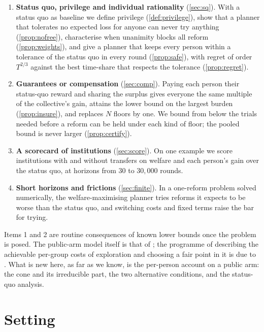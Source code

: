 \documentclass[11pt,a4paper]{article}
\theoremstyle{plain}
\theoremstyle{definition}
\theoremstyle{remark}
\begin{document}
\begin{enumerate}[leftmargin=*,itemsep=2pt]
  \item \textbf{Status quo, privilege and individual rationality} (\cref{sec:sq}). With a status quo as baseline we define privilege (\cref{def:privilege}), show that a planner that tolerates no expected loss for anyone can never try anything (\cref{prop:nofree}), characterise when unanimity blocks all reform (\cref{prop:weights}), and give a planner that keeps every person within a tolerance of the status quo in every round (\cref{prop:safe}), with regret of order $T^{2/3}$ against the best time-share that respects the tolerance (\cref{prop:regret}).
  \item \textbf{Guarantees or compensation} (\cref{sec:comp}). Paying each person their status-quo reward and sharing the surplus gives everyone the same multiple of the collective's gain, attains the lower bound on the largest burden (\cref{prop:insure}), and replaces $N$ floors by one. We bound from below the trials needed before a reform can be held under each kind of floor; the pooled bound is never larger (\cref{prop:certify}).
  \item \textbf{A scorecard of institutions} (\cref{sec:score}). On one example we score institutions with and without transfers on welfare and each person's gain over the status quo, at horizons from $30$ to $30{,}000$ rounds.
  \item \textbf{Short horizons and frictions} (\cref{sec:finite}). In a one-reform problem solved numerically, the welfare-maximising planner tries reforms it expects to be worse than the status quo, and switching costs and fixed terms raise the bar for trying.
\end{enumerate}

Items 1 and 2 are routine consequences of known lower bounds once the problem is posed. The public-arm model itself is that of \citet{hossain2021}; the programme of describing the achievable per-group costs of exploration and choosing a fair point in it is due to \citet{baek2021}. What is new here, as far as we know, is the per-person account on a public arm: the cone and its irreducible part, the two alternative conditions, and the status-quo analysis.

\section{Setting}\label{sec:setting}
\end{document}
